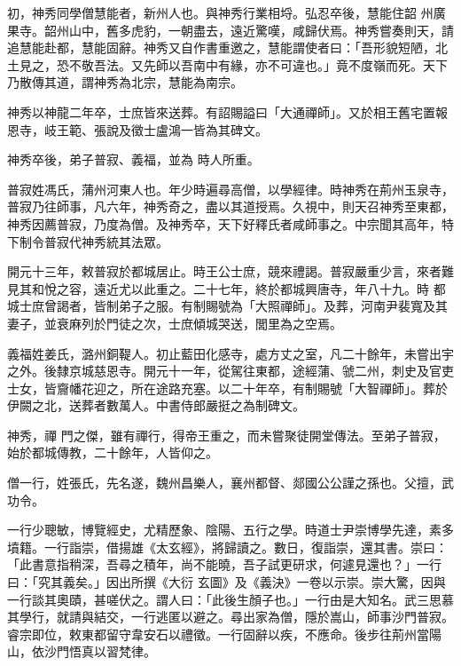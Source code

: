 \begin{pinyinscope}
 初，神秀同學僧慧能者，新州人也。與神秀行業相埒。弘忍卒後，慧能住韶
 州廣果寺。韶州山中，舊多虎豹，一朝盡去，遠近驚嘆，咸歸伏焉。神秀嘗奏則天，請追慧能赴都，慧能固辭。神秀又自作書重邀之，慧能謂使者曰：「吾形貌短陋，北土見之，恐不敬吾法。又先師以吾南中有緣，亦不可違也。」竟不度嶺而死。天下乃散傳其道，謂神秀為北宗，慧能為南宗。



 神秀以神龍二年卒，士庶皆來送葬。有詔賜謚曰「大通禪師」。又於相王舊宅置報恩寺，岐王範、張說及徵士盧鴻一皆為其碑文。



 神秀卒後，弟子普寂、義福，並為
 時人所重。



 普寂姓馮氏，蒲州河東人也。年少時遍尋高僧，以學經律。時神秀在荊州玉泉寺，普寂乃往師事，凡六年，神秀奇之，盡以其道授焉。久視中，則天召神秀至東都，神秀因薦普寂，乃度為僧。及神秀卒，天下好釋氏者咸師事之。中宗聞其高年，特下制令普寂代神秀統其法眾。



 開元十三年，敕普寂於都城居止。時王公士庶，競來禮謁。普寂嚴重少言，來者難見其和悅之容，遠近尤以此重之。二十七年，終於都城興唐寺，年八十九。時
 都城士庶曾謁者，皆制弟子之服。有制賜號為「大照禪師」。及葬，河南尹裴寬及其妻子，並衰麻列於門徒之次，士庶傾城哭送，閭里為之空焉。



 義福姓姜氏，潞州銅鞮人。初止藍田化感寺，處方丈之室，凡二十餘年，未嘗出宇之外。後隸京城慈恩寺。開元十一年，從駕往東都，途經蒲、虢二州，刺史及官吏士女，皆齎幡花迎之，所在途路充塞。以二十年卒，有制賜號「大智禪師」。葬於伊闕之北，送葬者數萬人。中書侍郎嚴挺之為制碑文。



 神秀，禪
 門之傑，雖有禪行，得帝王重之，而未嘗聚徒開堂傳法。至弟子普寂，始於都城傳教，二十餘年，人皆仰之。



 僧一行，姓張氏，先名遂，魏州昌樂人，襄州都督、郯國公公謹之孫也。父擅，武功令。



 一行少聰敏，博覽經史，尤精歷象、陰陽、五行之學。時道士尹崇博學先達，素多墳籍。一行詣崇，借揚雄《太玄經》，將歸讀之。數日，復詣崇，還其書。崇曰：「此書意指稍深，吾尋之積年，尚不能曉，吾子試更研求，何遽見還也？」一行曰：「究其義矣。」因出所撰《大衍
 玄圖》及《義決》一卷以示崇。崇大驚，因與一行談其奧賾，甚嗟伏之。謂人曰：「此後生顏子也。」一行由是大知名。武三思慕其學行，就請與結交，一行逃匿以避之。尋出家為僧，隱於嵩山，師事沙門普寂。睿宗即位，敕東都留守韋安石以禮徵。一行固辭以疾，不應命。後步往荊州當陽山，依沙門悟真以習梵律。




\end{pinyinscope}
